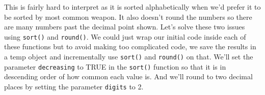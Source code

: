 \documentclass[
]{krantz}
\makeatletter
\newenvironment{Shaded}{\begin{snugshade}}{\end{snugshade}}
\newcommand{\AttributeTok}[1]{\textcolor[rgb]{0.61,0.61,0.61}{#1}}
\newcommand{\CommentTok}[1]{\textcolor[rgb]{0.37,0.37,0.37}{\textit{#1}}}
\newcommand{\ConstantTok}[1]{\textcolor[rgb]{0,0,0}{#1}}
\newcommand{\DecValTok}[1]{\textcolor[rgb]{0.06,0.06,0.06}{#1}}
\newcommand{\FunctionTok}[1]{\textcolor[rgb]{0,0,0}{#1}}
\newcommand{\NormalTok}[1]{#1}
\newcommand{\OtherTok}[1]{\textcolor[rgb]{0.37,0.37,0.37}{#1}}
\newcommand{\SpecialCharTok}[1]{\textcolor[rgb]{0,0,0}{#1}}
\newenvironment{kframe}{%
\medskip{}
\setlength{\fboxsep}{.8em}
 \def\at@end@of@kframe{}%
 \ifinner\ifhmode%
  \def\at@end@of@kframe{\end{minipage}}%
  \begin{minipage}{\columnwidth}%
 \fi\fi%
 \def\FrameCommand##1{\hskip\@totalleftmargin \hskip-\fboxsep
 \colorbox{shadecolor}{##1}\hskip-\fboxsep
     \hskip-\linewidth \hskip-\@totalleftmargin \hskip\columnwidth}%
 \MakeFramed {\advance\hsize-\width
   \@totalleftmargin\z@ \linewidth\hsize
   \@setminipage}}%
 {\par\unskip\endMakeFramed%
 \at@end@of@kframe}
\renewenvironment{Shaded}{\begin{kframe}}{\end{kframe}}
\makeatother
\begin{document}
This is fairly hard to interpret as it is sorted alphabetically when we'd prefer it to be sorted by most common weapon. It also doesn't round the numbers so there are many numbers past the decimal point shown. Let's solve these two issues using \texttt{sort()} and \texttt{round()}. We could just wrap our initial code inside each of these functions but to avoid making too complicated code, we save the results in a temp object and incrementally use \texttt{sort()} and \texttt{round()} on that. We'll set the parameter \texttt{decreasing} to TRUE in the \texttt{sort()} function so that it is in descending order of how common each value is. And we'll round to two decimal places by setting the parameter \texttt{digits} to 2.

\begin{Shaded}
\end{Shaded}
\end{document}
